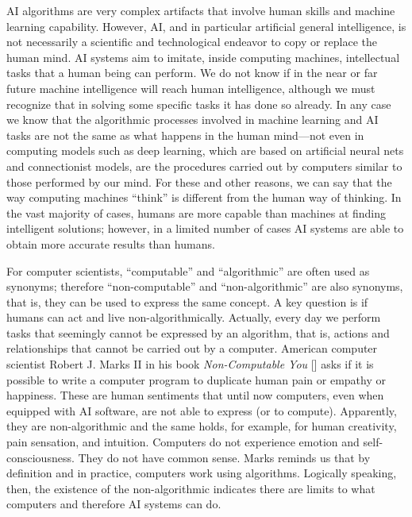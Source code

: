 AI algorithms are very complex artifacts that involve human skills and machine learning capability. However, AI, and in particular artificial general intelligence, is not necessarily a scientific and technological endeavor to copy or replace the human mind. AI systems aim to imitate, inside computing machines, intellectual tasks that a human being can perform. We do not know if in the near or far future machine intelligence will reach human intelligence, although we must recognize that in solving some specific tasks it has done so already. In any case we know that the algorithmic processes involved in machine learning and AI tasks are not the same as what happens in the human mind---not even in computing models such as deep learning, which are based on artificial neural nets and connectionist models, are the procedures carried out by computers similar to those performed by our mind. For these and other reasons, we can say that the way computing machines ``think'' is different from the human way of thinking. In the vast majority of cases, humans are more capable than machines at finding intelligent solutions; however, in a limited number of cases AI systems are able to obtain more accurate results than humans.

For computer scientists, ``computable'' and ``algorithmic'' are often used as synonyms; therefore ``non-computable'' and ``non-algorithmic'' are also synonyms, that is, they can be used to express the same concept. A key question is if humans can act and live non-algorithmically. Actually, every day we perform tasks that seemingly cannot be expressed by an algorithm, that is, actions and relationships that cannot be carried out by a computer. American computer scientist Robert J. Marks II in his book \textit{Non-Computable You} [\citealt{chap:11:Marks:2022}] asks if it is possible to write a computer program to duplicate human pain or empathy or happiness. These are human sentiments that until now computers, even when equipped with AI \hbox{software}, are not able to express (or to compute). Apparently, they are non-algorithmic and the same holds, for example, for human creativity, pain sensation, and intuition. Computers do not experience emotion and self-consciousness. They do not have common sense. Marks reminds us that by definition and in practice, computers work using algorithms. Logically speaking, then, the existence of the non-algorithmic indicates there are limits to what computers and therefore AI systems can do.

